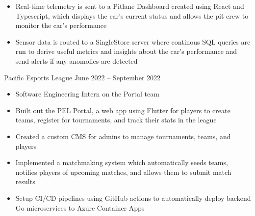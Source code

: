 \documentclass[9pt]{developercv} %
\begin{document}
\begin{entrylist}
{\begin{itemize}[noitemsep,topsep=0pt,parsep=0pt,partopsep=0pt, leftmargin=10pt]
            \item Real-time telemetry is sent to a Pitlane Dashboard created using React and Typescript, which displays the car's current status and allows the pit crew to monitor the car's performance
            \item Sensor data is routed to a SingleStore server where continous SQL queries are run to derive useful metrics and insights about the car's performance and send alerts if any anomolies are detected
        \end{itemize}}
	\entry
		{}
		{Pacific Esports League}
		{June 2022 – September 2022}
		{\vspace{-10pt}
        \begin{itemize}[noitemsep,topsep=0pt,parsep=0pt,partopsep=0pt, leftmargin=10pt]
            \item Software Engineering Intern on the Portal team
            \item Built out the PEL Portal, a web app using Flutter for players to create teams, register for tournaments, and track their stats in the league
            \item Created a custom CMS for admins to manage tournaments, teams, and players
            \item Implemented a matchmaking system which automatically seeds teams, notifies players of upcoming matches, and allows them to submit match results
            \item Setup CI/CD pipelines using GitHub actions to automatically deploy backend Go microservices to Azure Container Apps
        \end{itemize}}
\end{entrylist}
\end{document}
